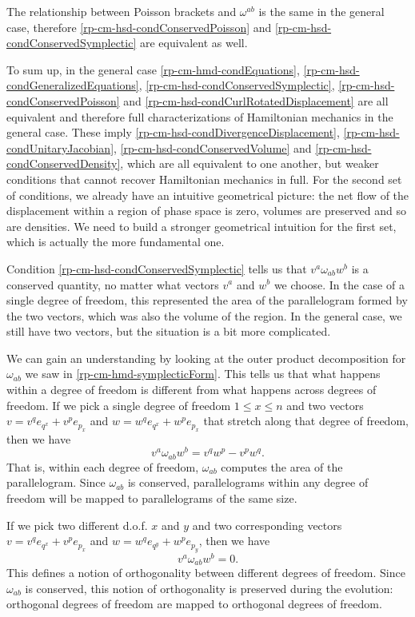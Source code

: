 The relationship between Poisson brackets and $\omega^{ab}$ is the same in the general case, therefore \ref{rp-cm-hsd-condConservedPoisson} and \ref{rp-cm-hsd-condConservedSymplectic} are equivalent as well.

To sum up, in the general case \ref{rp-cm-hmd-condEquations}, \ref{rp-cm-hsd-condGeneralizedEquations}, \ref{rp-cm-hsd-condConservedSymplectic}, \ref{rp-cm-hsd-condConservedPoisson} and \ref{rp-cm-hsd-condCurlRotatedDisplacement} are all equivalent and therefore full characterizations of Hamiltonian mechanics in the general case. These imply \ref{rp-cm-hsd-condDivergenceDisplacement}, \ref{rp-cm-hsd-condUnitaryJacobian}, \ref{rp-cm-hsd-condConservedVolume} and \ref{rp-cm-hsd-condConservedDensity}, which are all equivalent to one another, but weaker conditions that cannot recover Hamiltonian mechanics in full. For the second set of conditions, we already have an intuitive geometrical picture: the net flow of the displacement within a region of phase space is zero, volumes are preserved and so are densities. We need to build a stronger geometrical intuition for the first set, which is actually the more fundamental one.

Condition \ref{rp-cm-hsd-condConservedSymplectic} tells us that $v^a \omega_{ab} w^b$ is a conserved quantity, no matter what vectors $v^a$ and $w^b$ we choose. In the case of a single degree of freedom, this represented the area of the parallelogram formed by the two vectors, which was also the volume of the region. In the general case, we still have two vectors, but the situation is a bit more complicated.

We can gain an understanding by looking at the outer product decomposition for $\omega_{ab}$ we saw in \ref{rp-cm-hmd-symplecticForm}. This tells us that what happens within a degree of freedom is different from what happens across degrees of freedom. If we pick a single degree of freedom $1 \leq x \leq n$ and two vectors $v = v^q e_{q^x} + v^p e_{p_x}$ and $w = w^q e_{q^x} + w^p e_{p_x}$ that stretch along that degree of freedom, then we have
\begin{equation}
	v^a \omega_{ab} w^b =  v^q w^p - v^p w^q.
\end{equation}
That is, within each degree of freedom, $\omega_{ab}$ computes the area of the parallelogram. Since $\omega_{ab}$ is conserved, parallelograms within any degree of freedom will be mapped to parallelograms of the same size.

If we pick two different d.o.f. $x$ and $y$ and two corresponding vectors $v = v^q e_{q^x} + v^p e_{p_x}$ and $w = w^q e_{q^y} + w^p e_{p_y}$, then we have
\begin{equation}
	v^a \omega_{ab} w^b =  0.
\end{equation}
This defines a notion of orthogonality between different degrees of freedom. Since $\omega_{ab}$ is conserved, this notion of orthogonality is preserved during the evolution: orthogonal degrees of freedom are mapped to orthogonal degrees of freedom.


